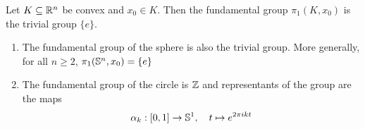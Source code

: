 \begin{ex}[]
Let $K \subseteq \mathbb{R}^{n}$ be convex and $x_0 \in K$. Then the fundamental group $\pi_1(K,x_0)$ is the trivial group $\{e\}$.
\end{ex}

\begin{thm}[]
  \begin{enumerate}
    \item The fundamental group of the sphere is also the trivial group. More generally, for all $n \geq 2$, $\pi_1(\mathbb{S}^{n},x_0) = \{e\}$ 
    \item The fundamental group of the circle is $\mathbb{Z}$ and representants of the group are the maps
      \begin{align*}
        \alpha_k:[0,1] \to \mathbb{S}^{1}, \quad t \mapsto  e^{2 \pi i k t}
      \end{align*}
  \end{enumerate}
\end{thm}
